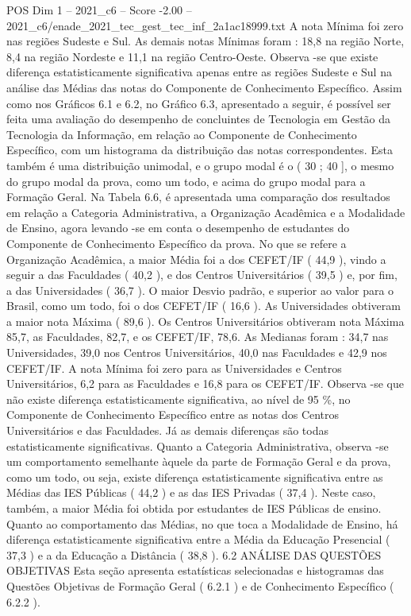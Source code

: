 \begin{textsample}{POS Dim 1 – 2021\_c6 – Score -2.00 – 2021\_c6/enade\_2021\_tec\_gest\_tec\_inf\_2a1ac18999.txt}
A nota Mínima foi zero nas regiões Sudeste e Sul.
As demais notas Mínimas foram : 18,8 na região Norte, 8,4 na região Nordeste e 11,1 na região Centro-Oeste.
Observa -se que existe diferença estatisticamente significativa apenas entre as regiões Sudeste e Sul na análise das Médias das notas do Componente de Conhecimento Específico.
Assim como nos Gráficos 6.1 e 6.2, no Gráfico 6.3, apresentado a seguir, é possível ser feita uma avaliação do desempenho de concluintes de Tecnologia em Gestão da Tecnologia da Informação, em relação ao Componente de Conhecimento Específico, com um histograma da distribuição das notas correspondentes.
Esta também é uma distribuição unimodal, e o grupo modal é o ( 30 ; 40 ], o mesmo do grupo modal da prova, como um todo, e acima do grupo modal para a Formação Geral.
Na Tabela 6.6, é apresentada uma comparação dos resultados em relação a Categoria Administrativa, a Organização Acadêmica e a Modalidade de Ensino, agora levando -se em conta o desempenho de estudantes do Componente de Conhecimento Específico da prova.
No que se refere a Organização Acadêmica, a maior Média foi a dos CEFET/IF ( 44,9 ), vindo a seguir a das Faculdades ( 40,2 ), e dos Centros Universitários ( 39,5 ) e, por fim, a das Universidades ( 36,7 ).
O maior Desvio padrão, e superior ao valor para o Brasil, como um todo, foi o dos CEFET/IF ( 16,6 ).
As Universidades obtiveram a maior nota Máxima ( 89,6 ).
Os Centros Universitários obtiveram nota Máxima 85,7, as Faculdades, 82,7, e os CEFET/IF, 78,6.
As Medianas foram : 34,7 nas Universidades, 39,0 nos Centros Universitários, 40,0 nas Faculdades e 42,9 nos CEFET/IF.
A nota Mínima foi zero para as Universidades e Centros Universitários, 6,2 para as Faculdades e 16,8 para os CEFET/IF.
Observa -se que não existe diferença estatisticamente significativa, ao nível de 95 \%, no Componente de Conhecimento Específico entre as notas dos Centros Universitários e das Faculdades.
Já as demais diferenças são todas estatisticamente significativas.
Quanto a Categoria Administrativa, observa -se um comportamento semelhante àquele da parte de Formação Geral e da prova, como um todo, ou seja, existe diferença estatisticamente significativa entre as Médias das IES Públicas ( 44,2 ) e as das IES Privadas ( 37,4 ).
Neste caso, também, a maior Média foi obtida por estudantes de IES Públicas de ensino.
Quanto ao comportamento das Médias, no que toca a Modalidade de Ensino, há diferença estatisticamente significativa entre a Média da Educação Presencial ( 37,3 ) e a da Educação a Distância ( 38,8 ). 6.2 ANÁLISE DAS QUESTÕES OBJETIVAS Esta seção apresenta estatísticas selecionadas e histogramas das Questões Objetivas de Formação Geral ( 6.2.1 ) e de Conhecimento Específico ( 6.2.2 ).

\end{textsample}

